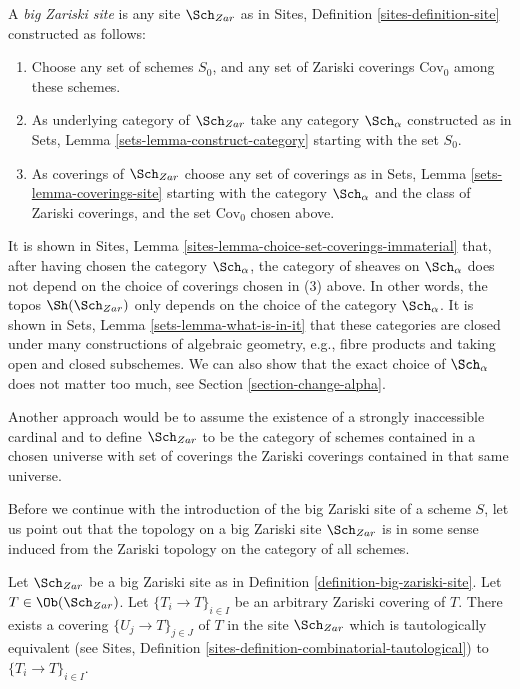 \begin{definition}
\label{definition-big-zariski-site}
A {\it big Zariski site} is any site $\Sch_{Zar}$ as in
Sites, Definition \ref{sites-definition-site} constructed as follows:
\begin{enumerate}
\item Choose any set of schemes $S_0$, and any set of Zariski coverings
$\text{Cov}_0$ among these schemes.
\item As underlying category of $\Sch_{Zar}$
take any category $\Sch_\alpha$ constructed as in
Sets, Lemma \ref{sets-lemma-construct-category} starting with the set $S_0$.
\item As coverings of $\Sch_{Zar}$ choose any set of coverings as in
Sets, Lemma \ref{sets-lemma-coverings-site} starting with the
category $\Sch_\alpha$ and the class of Zariski coverings,
and the set $\text{Cov}_0$ chosen above.
\end{enumerate}
\end{definition}

\noindent
It is shown in Sites, Lemma \ref{sites-lemma-choice-set-coverings-immaterial}
that, after having chosen the category $\Sch_\alpha$, the
category of sheaves on $\Sch_\alpha$ does not depend on the
choice of coverings chosen in (3) above. In other words, the topos
$\Sh(\Sch_{Zar})$ only depends on the choice of
the category $\Sch_\alpha$. It is shown in
Sets, Lemma \ref{sets-lemma-what-is-in-it} that these categories
are closed under many constructions of algebraic geometry, e.g.,
fibre products and taking open and closed subschemes. We can also show
that the exact choice of $\Sch_\alpha$ does not matter
too much, see Section \ref{section-change-alpha}.

\medskip\noindent
Another approach would be to assume the existence of a
strongly inaccessible cardinal and to define $\Sch_{Zar}$
to be the category of schemes contained in a chosen universe with
set of coverings the Zariski coverings contained in that same
universe.

\medskip\noindent
Before we continue with the introduction of the big Zariski site of
a scheme $S$, let us point out that the topology on a big Zariski site
$\Sch_{Zar}$ is in some sense induced from the Zariski topology
on the category of all schemes.

\begin{lemma}
\label{lemma-zariski-induced}
Let $\Sch_{Zar}$ be a big Zariski site as in
Definition \ref{definition-big-zariski-site}.
Let $T \in \Ob(\Sch_{Zar})$.
Let $\{T_i \to T\}_{i \in I}$ be an arbitrary Zariski covering of $T$.
There exists a covering $\{U_j \to T\}_{j \in J}$ of $T$ in the site
$\Sch_{Zar}$ which is tautologically equivalent (see
Sites, Definition \ref{sites-definition-combinatorial-tautological})
to $\{T_i \to T\}_{i \in I}$.
\end{lemma}

